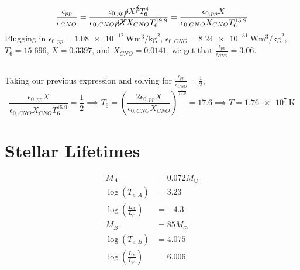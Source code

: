 \documentclass{article}
\begin{document}
\begin{equation}
    \frac{\epsilon_{pp}}{\epsilon_{CNO}} = \frac{\epsilon_{0, pp} \cancel{\rho} X^{\cancel{2}} T_6^4}{\epsilon_{0, CNO} \cancel{\rho} \cancel{X} X_{CNO} T_6^{19.9}} = \frac{\epsilon_{0, pp} X}{\epsilon_{0, CNO} X_{CNO} T_6^{15.9}}
\end{equation}
Plugging in \(\epsilon_{0, pp} = \SI{1.08e-12}{\watt\meter\cubed\per\kilogram\squared}\), \(\epsilon_{0, CNO} = \SI{8.24e-31}{\watt\meter\cubed\per\kilogram\squared}\), \(T_6 = \num{15.696}\), \(X = \num{0.3397}\), and \(X_{CNO} = \num{0.0141}\), we get that \(\frac{\epsilon_{pp}}{\epsilon_{CNO}} = \num{3.06}\).

\subsection{}

Taking our previous expression and solving for \(\frac{\epsilon_{pp}}{\epsilon_{CNO}} = \frac{1}{2}\),
\begin{equation}
    \frac{\epsilon_{0, pp} X}{\epsilon_{0, CNO} X_{CNO} T_6^{15.9}} = \frac{1}{2} \implies T_6 = \left(\frac{2 \epsilon_{0, pp} X}{\epsilon_{0, CNO} X_{CNO}}\right)^{\frac{1}{15.9}} = \num{17.6} \implies T = \SI{1.76e+7}{\kelvin}
\end{equation}

\section{Stellar Lifetimes}

\begin{align}
    M_A &= \num{0.072} M_\odot \\
    \log(T_{e, A}) &= \num{3.23} \\
    \log\left(\frac{L_A}{L_\odot}\right) &= \num{-4.3} \\
    M_B &= \num{85} M_\odot \\
    \log(T_{e, B}) &= \num{4.075} \\
    \log\left(\frac{L_B}{L_\odot}\right) &= \num{6.006}
\end{align}

\subsection{}
\end{document}
